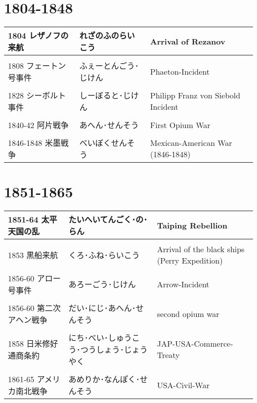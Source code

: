 \documentclass{article}
\begin{document}
\section{1804-1848}
\begin{tabular}{p{4.5cm} | p{4.5cm} | p{10.5cm}}
1804 レザノフの来航&れざのふのらいこう&Arrival of Rezanov \\ \hline \\[-1em]
1808 フェートン号事件&ふぇーとんごう･じけん&Phaeton-Incident \\ \hline \\[-1em]
1828 シーボルト事件&しーぼると･じけん&Philipp Franz von Siebold Incident \\ \hline \\[-1em]
1840-42 阿片戦争&あへん･せんそう&First Opium War​ \\ \hline \\[-1em]
1846-1848 米墨戦争&べいぼくせんそう&Mexican-American War (1846-1848)​
\end{tabular}

\section{1851-1865}
\begin{tabular}{p{4.5cm} | p{4.5cm} | p{10.5cm}}
1851-64 太平天国の乱 & たいへいてんごく･の･らん  &Taiping Rebellion \\ \hline \\[-1em]
1853 黒船来航 & くろ･ふね･らいこう & Arrival of the black ships (Perry Expedition) \\ \hline \\[-1em]
1856-60 アロー号事件 & あろーごう･じけん & Arrow-Incident \\ \hline \\[-1em]
1856-60 第二次アヘン戦争 & だい･にじ･あへん･せんそう & second opium war \\ \hline \\[-1em]
1858 日米修好通商条約 & にち･べい･しゅうこう･つうしょう･じょうやく&JAP-USA-Commerce-Treaty \\ \hline \\[-1em]
1861-65 アメリカ南北戦争 & あめりか･なんぽく･せんそう & USA-Civil-War
\end{tabular}
\end{document}

